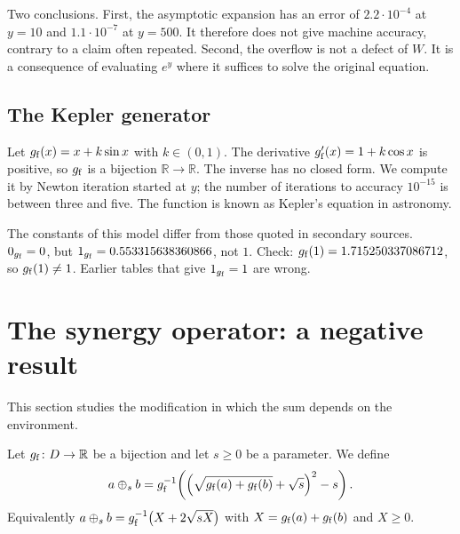 \documentclass[11pt,a4paper]{article}
\begin{document}
Two conclusions. First, the asymptotic expansion has an error of
$2.2\cdot10^{-4}$ at $y=10$ and $1.1\cdot10^{-7}$ at $y=500$. It therefore does
not give machine accuracy, contrary to a claim often repeated. Second, the
overflow is not a defect of $W$. It is a consequence of evaluating $e^{y}$ where
it suffices to solve the original equation.

\subsection{The Kepler generator}

Let $g_{\mathrm{f}}(x)=x+k\sin x$ with $k\in(0,1)$. The derivative $g_{\mathrm{f}}'(x)=1+k\cos x$ is
positive, so $g_{\mathrm{f}}$ is a bijection $\mathbb{R}\to\mathbb{R}$. The inverse has no
closed form. We compute it by Newton iteration started at $y$; the number of
iterations to accuracy $10^{-15}$ is between three and five. The function is
known as Kepler's equation in astronomy.

The constants of this model differ from those quoted in secondary sources.
$0_{g_{\mathrm{f}}}=0$, but $1_{g_{\mathrm{f}}}=0.553315638360866$, not $1$. Check:
$g_{\mathrm{f}}(1)=1.715250337086712$, so $g_{\mathrm{f}}(1)\neq1$. Earlier tables that give
$1_{g_{\mathrm{f}}}=1$ are wrong.

\section{The synergy operator: a negative result}

This section studies the modification in which the sum depends on the
environment.

\begin{definition}
\label{def:synergy}
Let $g_{\mathrm{f}}\colon D\to\mathbb{R}$ be a bijection and let $s\ge0$ be a parameter. We
define
\begin{equation}
\label{eq:synergy}
a\mathbin{\oplus}_{s}b=g_{\mathrm{f}}^{-1}\!\left(\Big(\sqrt{g_{\mathrm{f}}(a)+g_{\mathrm{f}}(b)}+\sqrt{s}\Big)^{2}-s\right).
\end{equation}
Equivalently $a\mathbin{\oplus}_{s}b=g_{\mathrm{f}}^{-1}\big(X+2\sqrt{sX}\big)$ with
$X=g_{\mathrm{f}}(a)+g_{\mathrm{f}}(b)$ and $X\ge0$.
\end{definition}
\end{document}
